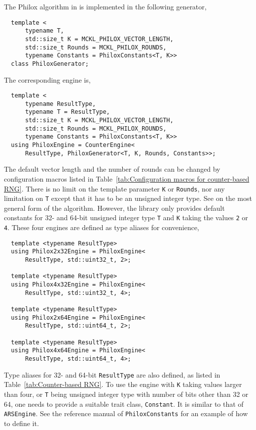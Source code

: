 The Philox algorithm in \textcite{Salmon:2011um} is implemented in the
following generator,
\begin{Verbatim}
  template <
      typename T,
      std::size_t K = MCKL_PHILOX_VECTOR_LENGTH,
      std::size_t Rounds = MCKL_PHILOX_ROUNDS,
      typename Constants = PhiloxConstants<T, K>>
  class PhiloxGenerator;
\end{Verbatim}
The corresponding \rng engine is,
\begin{Verbatim}
  template <
      typename ResultType,
      typename T = ResultType,
      std::size_t K = MCKL_PHILOX_VECTOR_LENGTH,
      std::size_t Rounds = MCKL_PHILOX_ROUNDS,
      typename Constants = PhiloxConstants<T, K>>
  using PhiloxEngine = CounterEngine<
      ResultType, PhiloxGenerator<T, K, Rounds, Constants>>;
\end{Verbatim}
The default vector length and the number of rounds can be changed by
configuration macros listed in Table~\ref{tab:Configuration macros for
  counter-based RNG}. There is no limit on the template parameter \verb|K| or
\verb|Rounds|, nor any limitation on \verb|T| except that it has to be an
unsigned integer type. See \textcite{Salmon:2011um} on the most general form of
the algorithm. However, the library only provides default constants for 32- and
64-bit unsigned integer type \verb|T| and \verb|K| taking the values \verb|2|
or \verb|4|. These four engines are defined as type aliases for convenience,
\begin{Verbatim}
  template <typename ResultType>
  using Philox2x32Engine = PhiloxEngine<
      ResultType, std::uint32_t, 2>;

  template <typename ResultType>
  using Philox4x32Engine = PhiloxEngine<
      ResultType, std::uint32_t, 4>;

  template <typename ResultType>
  using Philox2x64Engine = PhiloxEngine<
      ResultType, std::uint64_t, 2>;

  template <typename ResultType>
  using Philox4x64Engine = PhiloxEngine<
      ResultType, std::uint64_t, 4>;
\end{Verbatim}
Type aliases for 32- and 64-bit \verb|ResultType| are also defined, as listed
in Table~\ref{tab:Counter-based RNG}. To use the engine with \verb|K| taking
values larger than four, or \verb|T| being unsigned integer type with number of
bits other than 32 or 64, one needs to provide a suitable trait class,
\verb|Constant|. It is similar to that of \verb|ARSEngine|. See the reference
manual of \verb|PhiloxConstants| for an example of how to define it.

